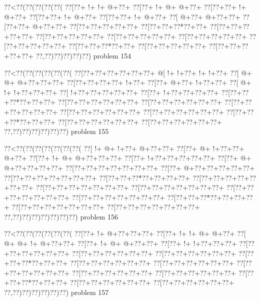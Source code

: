 \vbox{\vbox{\goo
\0??<\0??(\0??(\0??(\0??(\0??(
\0??[\0??+\- !+\- !+\- @+\0??+
\0??[\0??+\- !+\- @+\- @+\0??+
\0??[\0??+\0??+\- !+\- @+\0??+
\0??[\0??+\0??+\- !+\- @+\0??+
\0??[\0??+\0??+\- !+\- @+\0??+
\0??[\- @+\0??+\- @+\0??+\0??+
\0??[\0??+\0??+\- @+\0??+\0??+
\0??[\0??+\0??+\0??+\0??+\0??+
\0??[\0??+\0??+\0??*\0??+\0??+
\0??[\0??+\0??+\0??+\0??+\0??+
\0??[\0??+\0??+\0??+\0??+\0??+
\0??[\0??+\0??+\0??+\0??+\0??+
\0??[\0??+\0??+\0??+\0??+\0??+
\0??[\0??+\0??+\0??+\0??+\0??+
\0??[\0??+\0??+\0??*\0??+\0??+
\0??[\0??+\0??+\0??+\0??+\0??+
\0??[\0??+\0??+\0??+\0??+\0??+
\0??,\0??)\0??)\0??)\0??)\0??)
}
\hfil problem 154\hfil\break
}

\vbox{\vbox{\goo
\0??<\0??(\0??(\0??(\0??(\0??(\0??(
\0??[\0??+\0??+\0??+\0??+\0??+\0??+
\- @[\- !+\- !+\0??+\- !+\- !+\0??+
\0??[\- @+\- @+\- @+\0??+\0??+\0??+
\0??[\0??+\0??+\0??+\0??+\- !+\0??+
\0??[\0??+\- @+\0??+\- !+\0??+\0??+
\0??[\- @+\- !+\- !+\0??+\0??+\0??+
\0??[\- !+\0??+\0??+\0??+\0??+\0??+
\0??[\0??+\- !+\0??+\0??+\0??+\0??+
\0??[\0??+\0??+\0??*\0??+\0??+\0??+
\0??[\0??+\0??+\0??+\0??+\0??+\0??+
\0??[\0??+\0??+\0??+\0??+\0??+\0??+
\0??[\0??+\0??+\0??+\0??+\0??+\0??+
\0??[\0??+\0??+\0??+\0??+\0??+\0??+
\0??[\0??+\0??+\0??+\0??+\0??+\0??+
\0??[\0??+\0??+\0??*\0??+\0??+\0??+
\0??[\0??+\0??+\0??+\0??+\0??+\0??+
\0??[\0??+\0??+\0??+\0??+\0??+\0??+
\0??,\0??)\0??)\0??)\0??)\0??)\0??)
}
\hfil problem 155\hfil\break
}

\vbox{\vbox{\goo
\0??<\0??(\0??(\0??(\0??(\0??(\0??(\0??(
\0??[\- !+\- @+\- !+\0??+\- @+\0??+\0??+
\0??[\0??+\- @+\- !+\0??+\0??+\- @+\0??+
\0??[\0??+\- !+\- @+\- @+\0??+\0??+\0??+
\0??[\0??+\- !+\0??+\0??+\0??+\0??+\0??+
\0??[\0??+\- @+\- @+\0??+\0??+\0??+\0??+
\0??[\0??+\0??+\0??+\0??+\0??+\0??+\0??+
\0??[\0??+\- @+\0??+\0??+\0??+\0??+\0??+
\0??[\0??+\0??+\0??+\0??+\0??+\0??+\0??+
\0??[\0??+\0??+\0??*\0??+\0??+\0??+\0??+
\0??[\0??+\0??+\0??+\0??+\0??+\0??+\0??+
\0??[\0??+\0??+\0??+\0??+\0??+\0??+\0??+
\0??[\0??+\0??+\0??+\0??+\0??+\0??+\0??+
\0??[\0??+\0??+\0??+\0??+\0??+\0??+\0??+
\0??[\0??+\0??+\0??+\0??+\0??+\0??+\0??+
\0??[\0??+\0??+\0??*\0??+\0??+\0??+\0??+
\0??[\0??+\0??+\0??+\0??+\0??+\0??+\0??+
\0??[\0??+\0??+\0??+\0??+\0??+\0??+\0??+
\0??,\0??)\0??)\0??)\0??)\0??)\0??)\0??)
}
\hfil problem 156\hfil\break
}

\vbox{\vbox{\goo
\0??<\0??(\0??(\0??(\0??(\0??(\0??(
\0??[\0??+\- !+\- @+\0??+\0??+\0??+
\0??[\0??+\- !+\- !+\- @+\- @+\0??+
\0??[\- @+\- @+\- !+\- @+\0??+\0??+
\0??[\0??+\- !+\- @+\- @+\0??+\0??+
\0??[\0??+\- !+\- !+\0??+\0??+\0??+
\0??[\0??+\0??+\0??+\0??+\0??+\0??+
\0??[\0??+\0??+\0??+\0??+\0??+\0??+
\0??[\0??+\0??+\0??+\0??+\0??+\0??+
\0??[\0??+\0??+\0??*\0??+\0??+\0??+
\0??[\0??+\0??+\0??+\0??+\0??+\0??+
\0??[\0??+\0??+\0??+\0??+\0??+\0??+
\0??[\0??+\0??+\0??+\0??+\0??+\0??+
\0??[\0??+\0??+\0??+\0??+\0??+\0??+
\0??[\0??+\0??+\0??+\0??+\0??+\0??+
\0??[\0??+\0??+\0??*\0??+\0??+\0??+
\0??[\0??+\0??+\0??+\0??+\0??+\0??+
\0??[\0??+\0??+\0??+\0??+\0??+\0??+
\0??,\0??)\0??)\0??)\0??)\0??)\0??)
}
\hfil problem 157\hfil\break
}

